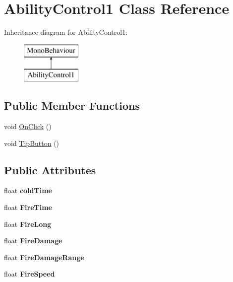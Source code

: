 \hypertarget{class_ability_control1}{}\section{Ability\+Control1 Class Reference}
\label{class_ability_control1}
Inheritance diagram for Ability\+Control1\+:\begin{figure}[H]
\begin{center}
\leavevmode
\includegraphics[height=2.000000cm]{class_ability_control1}
\end{center}
\end{figure}
\subsection*{Public Member Functions}
\begin{DoxyCompactItemize}
\item 
void \hyperlink{class_ability_control1_abc527bf8d7082fb87499fef96b19fd3c}{On\+Click} ()
\item 
void \hyperlink{class_ability_control1_a30521f80c369999bf9e6a5aa29a16d8f}{Tip\+Button} ()
\end{DoxyCompactItemize}
\subsection*{Public Attributes}
\begin{DoxyCompactItemize}
\item 
\mbox{\label{class_ability_control1_aabe8c521fb68d1a774dd9dbac2db5b45}} 
float {\bfseries cold\+Time}
\item 
\mbox{\label{class_ability_control1_a72350f3ee01605831bdcf0c6e07eba4a}} 
float {\bfseries Fire\+Time}
\item 
\mbox{\label{class_ability_control1_afb49297abea514a0e0b846ed99d2b286}} 
float {\bfseries Fire\+Long}
\item 
\mbox{\label{class_ability_control1_a201af072beff2e396269b46380556b1c}} 
float {\bfseries Fire\+Damage}
\item 
\mbox{\label{class_ability_control1_a0a95437b30baef21f4d5d18cef1f0ff5}} 
float {\bfseries Fire\+Damage\+Range}
\item 
\mbox{\label{class_ability_control1_a01f84127e227694587c6c47a1992d5ad}} 
float {\bfseries Fire\+Speed}
\end{DoxyCompactItemize}
